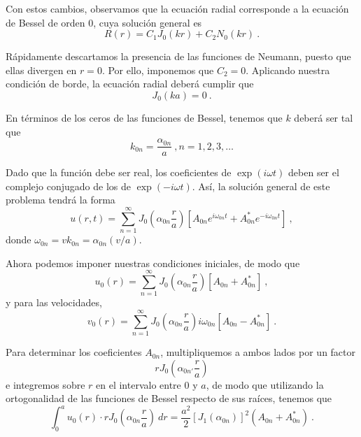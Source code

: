 \begin{ejemplo}
    Con estos cambios, observamos que la ecuación radial corresponde a la ecuación de Bessel de orden 0, cuya solución general es 
    \begin{equation*}
        R(r) = C_1 J_0(kr) + C_2 N_0(kr) \ .
    \end{equation*}

    Rápidamente descartamos la presencia de las funciones de Neumann, puesto que ellas divergen en $r = 0$. Por ello, imponemos que $C_2 = 0$. Aplicando nuestra condición de borde, la ecuación radial deberá cumplir que
    \begin{equation*}
        J_0(ka) = 0 \ .
    \end{equation*}

    En términos de los ceros de las funciones de Bessel, tenemos que $k$ deberá ser tal que
    \begin{equation*}
        k_{0n} = \frac{\alpha_{0n}}{a} \ , n = 1, 2, 3, \dots
    \end{equation*}

    Dado que la función debe ser real, los coeficientes de $\exp(i\omega t)$ deben ser el complejo conjugado de los de $\exp(-i \omega t)$. Así, la solución general de este problema tendrá la forma
    \begin{equation*}
        u(r, t) = \sum_{n=1}^\infty J_0 \left( \alpha_{0n} \frac{r}{a} \right) \left[A_{0n} e^{i \omega_{0n} t} + A^\ast_{0n} e^{-i \omega_{0n} t} \right] \ ,
    \end{equation*}
    donde $\omega_{0n} = vk_{0n} = \alpha_{0n} (v/a)$.

    Ahora podemos imponer nuestras condiciones iniciales, de modo que
    \begin{equation*}
        u_0(r) = \sum_{n=1}^\infty J_0\left( \alpha_{0n} \frac{r}{a} \right) \left[ A_{0n} + A^\ast_{0n} \right] \ ,
    \end{equation*}
    y para las velocidades,
    \begin{equation*}
        v_0(r) = \sum_{n=1}^\infty J_0\left( \alpha_{0n} \frac{r}{a} \right) i \omega_{0n} \left[ A_{0n} - A^\ast_{0n} \right] \ .
    \end{equation*}

    Para determinar los coeficientes $A_{0n}$, multipliquemos a ambos lados por un factor
    \begin{equation*}
        r J_0\left( \alpha_{0 n'} \frac{r}{a} \right)
    \end{equation*}
    e integremos sobre $r$ en el intervalo entre $0$ y $a$, de modo que utilizando la ortogonalidad de las funciones de Bessel respecto de sus raíces, tenemos que
    \begin{equation*}
        \int_0^a u_0(r) \cdot r J_0\left( \alpha_{0n} \frac{r}{a} \right) \ dr = \frac{a^2}{2} [J_1(\alpha_{0n})]^2 (A_{0n} + A^\ast_{0n}) \ .
    \end{equation*}


\end{ejemplo}
